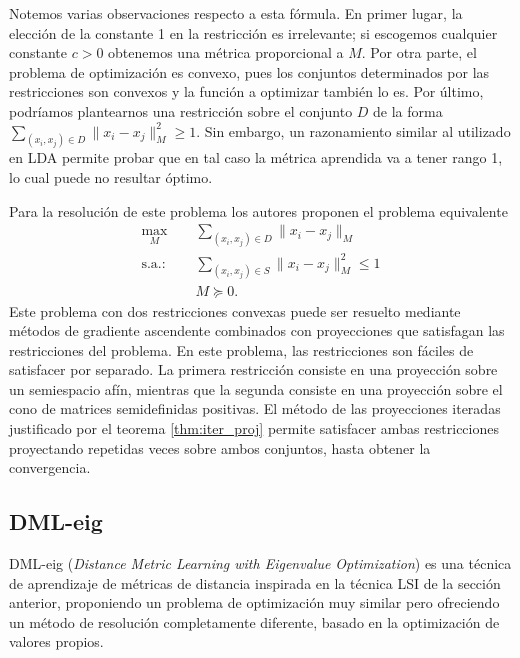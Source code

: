 Notemos varias observaciones respecto a esta fórmula. En primer lugar, la elección de la constante 1 en la restricción es irrelevante; si escogemos cualquier constante $c > 0$ obtenemos una métrica proporcional a $M$. Por otra parte, el problema de optimización es convexo, pues los conjuntos determinados por las restricciones son convexos y la función a optimizar también lo es. Por último, podríamos plantearnos una restricción sobre el conjunto $D$ de la forma $\sum_{(x_i,x_j) \in D} \|x_i - x_j\|_M^2 \ge 1$. Sin embargo, un razonamiento similar al utilizado en LDA permite probar que en tal caso la métrica aprendida va a tener rango 1, lo cual puede no resultar óptimo.

Para la resolución de este problema los autores proponen el problema equivalente
\begin{equation} \label{eq:lsi:equiv}
\begin{split}
    \max_{M} &\quad \sum_{(x_i,x_j)\in D}  \|x_i - x_j \|_M \\
    \text{s.a.: } &\quad \sum_{(x_i,x_j) \in S} \|x_i - x_j\|_M^2 \le 1 \\
                  &\quad M \succeq 0.
\end{split}
\end{equation}
Este problema con dos restricciones convexas puede ser resuelto mediante métodos de gradiente ascendente combinados con proyecciones que satisfagan las restricciones del problema. En este problema, las restricciones son fáciles de satisfacer por separado. La primera restricción consiste en una proyección sobre un semiespacio afín, mientras que la segunda consiste en una proyección sobre el cono de matrices semidefinidas positivas. El método de las proyecciones iteradas justificado por el teorema \ref{thm:iter_proj} permite satisfacer ambas restricciones proyectando repetidas veces sobre ambos conjuntos, hasta obtener la convergencia.

\subsection{DML-eig}

DML-eig (\emph{Distance Metric Learning with Eigenvalue Optimization}) \cite{dmleig} es una técnica de aprendizaje de métricas de distancia inspirada en la técnica LSI de la sección anterior, proponiendo un problema de optimización muy similar pero ofreciendo un método de resolución completamente diferente, basado en la optimización de valores propios.

